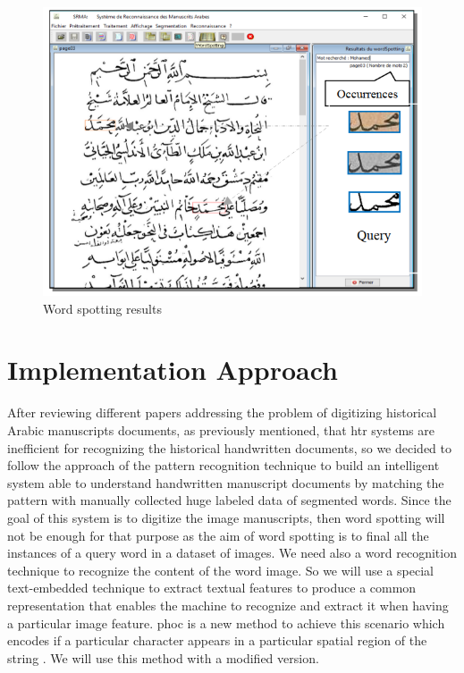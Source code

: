\begin{itemize}[labelindent=1em,labelsep=0.25cm,leftmargin=*]
        \begin{figure}[!htb]
            \centering
            \includegraphics[width=12cm]{images/noureddine-word-spotting-application.png}
            \caption{Word spotting results}
            \label{fig:noureddine-word-spotting-results}
        \end{figure}

\end{itemize}

\clearpage

\section{Implementation Approach}
After reviewing different papers addressing the problem of digitizing historical Arabic manuscripts documents, as previously mentioned, that \acrshort{htr} systems are inefficient for recognizing the historical handwritten documents, so we decided to follow the approach of the pattern recognition technique to build an intelligent system able to understand handwritten manuscript documents by matching the pattern with manually collected huge labeled data of segmented words. 
Since the goal of this system is to digitize the image manuscripts, then word spotting will not be enough for that purpose as the aim of word spotting is to final all the instances of a query word in a dataset of images. We need also a word recognition technique to recognize the content of the word image. So we will use a special text-embedded technique to extract textual features to produce a common representation that enables the machine to recognize and extract it when having a particular image feature. \acrfull{phoc} is a new method to achieve this scenario which encodes if a particular character appears in a particular spatial region of the string \cite{WORDSPOTTING}. We will use this method with a modified version. \\


